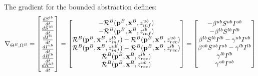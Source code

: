 \begin{example}
    The gradient for the bounded abstraction defines:
    \begin{eqnarray}
        \nabla_{\Theta^B, \Omega^B} = \begin{bmatrix} \frac{dS^{lb}}{dt}\\
                \frac{dS^{ub}}{dt}\\
                \frac{dI^{lb}}{dt}\\
                \frac{dI^{ub}}{dt}\\
                \frac{dR^{lb}}{dt}\\
                \frac{dR^{ub}}{dt} \end{bmatrix} = \begin{bmatrix} -{\cal
            R}^{B}({\bf p}^B, {\bf x}^B, z_{inf}^{ub})\\
            -{\cal R}^{B}({\bf p}^B, {\bf x}^B, z_{inf}^{lb})\\
             {\cal R}^{B}({\bf p}^B, {\bf x}^B, z_{inf}^{lb}) - {\cal
             R}^{B}({\bf p}^B, {\bf x}^B, z_{rec}^{ub})\\
             {\cal R}^{B}({\bf p}^B, {\bf x}^B, z_{inf}^{ub}) - {\cal
             R}^{B}({\bf p}^B, {\bf x}^B, z_{rec}^{lb})\\
             {\cal R}^{B}({\bf p}^B, {\bf x}^B, z_{rec}^{lb})\\
             {\cal R}^{B}({\bf p}^B, {\bf x}^B, z_{rec}^{ub}) \end{bmatrix} =
    \begin{bmatrix} -\beta^{ub} S^{ub} I^{ub}\\
        -\beta^{lb} S^{lb} I^{lb}\\
        \beta^{lb} S^{lb} I^{lb}-\gamma^{ub} I^{ub} \\
        \beta^{ub} S^{ub} I^{ub}-\gamma^{lb} I^{lb} \\
        \gamma^{lb} I^{lb}\\
        \gamma^{ub} I^{ub}
    \end{bmatrix} 
   \end{eqnarray}

\end{example}



